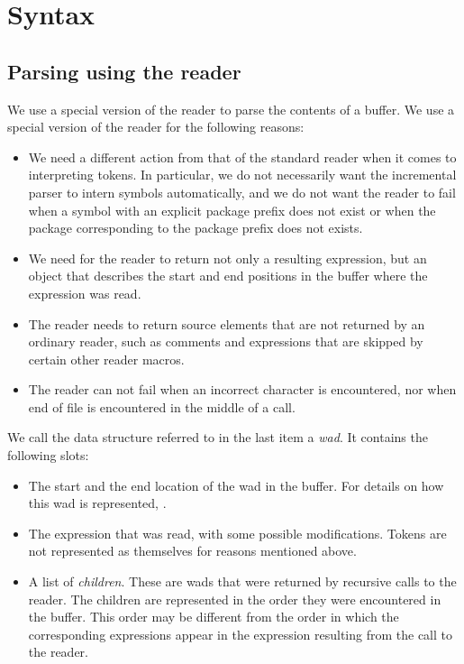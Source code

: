 \section{Syntax}

\subsection{Parsing using the \commonlisp{} reader}

We use a special version of the \commonlisp{} reader to parse the
contents of a buffer.  We use a special version of the reader for the
following reasons:

\begin{itemize}
\item We need a different action from that of the standard reader when
  it comes to interpreting tokens.  In particular, we do not
  necessarily want the incremental parser to intern symbols
  automatically, and we do not want the reader to fail when a symbol
  with an explicit package prefix does not exist or when the package
  corresponding to the package prefix does not exists.
\item We need for the reader to return not only a resulting
  expression, but an object that describes the start and end positions
  in the buffer where the expression was read.
\item The reader needs to return source elements that are not returned
  by an ordinary reader, such as comments and expressions that are
  skipped by certain other reader macros.
\item The reader can not fail when an incorrect character is
  encountered, nor when end of file is encountered in the middle of a
  call.
\end{itemize}

We call the data structure referred to in the last item a \emph{wad}.
It contains the following slots:

\begin{itemize}
\item The start and the end location of the wad in the
  buffer.  For details on how this wad is represented,
  .
\item The expression that was read, with some possible modifications.
  Tokens are not represented as themselves for reasons mentioned
  above.
\item A list of \emph{children}.  These are wads that were
  returned by recursive calls to the reader.  The children are
  represented in the order they were encountered in the buffer.  This
  order may be different from the order in which the corresponding
  expressions appear in the expression resulting from the call to the
  reader.
\end{itemize}


